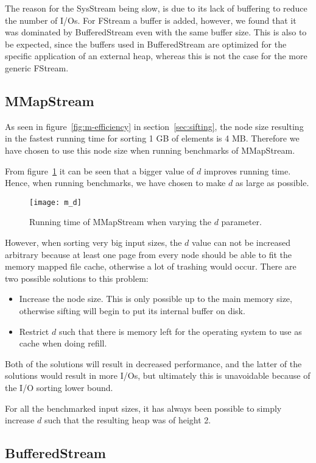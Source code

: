 The reason for the SysStream being slow, is due to its lack of buffering to reduce the number of I/Os. For FStream a buffer is added, however, we found that it was dominated by BufferedStream even with the same buffer size. This is also to be expected, since the buffers used in BufferedStream are optimized for the specific application of an external heap, whereas this is not the case for the more generic FStream.

\subsection{MMapStream}
As seen in figure~\ref{fig:m-efficiency} in section~\ref{sec:sifting}, the node size resulting in the fastest running time for sorting 1 GB of elements is 4 MB. Therefore we have chosen to use this node size when running benchmarks of MMapStream.

From figure~\ref{fig:m:vary-d} it can be seen that a bigger value of $d$ improves running time. Hence, when running benchmarks, we have chosen to make $d$ as large as possible. 

\begin{figure}[h!]
  \centering
  \texttt{[image: m\_d]}
  \caption{Running time of MMapStream when varying the $d$ parameter.}
  \label{fig:m:vary-d}
\end{figure}

However, when sorting very big input sizes, the $d$ value can not be increased arbitrary because at least one page from every node should be able to fit the memory mapped file cache, otherwise a lot of trashing would occur. There are two possible solutions to this problem:
\begin{itemize}
\item Increase the node size. This is only possible up to the main memory size, otherwise sifting will begin to put its internal buffer on disk.
\item Restrict $d$ such that there is memory left for the operating system to use as cache when doing refill.
\end{itemize}
Both of the solutions will result in decreased performance, and the latter of the solutions would result in more I/Os, but ultimately this is unavoidable because of the I/O sorting lower bound.

For all the benchmarked input sizes, it has always been possible to simply increase $d$ such that the resulting heap was of height 2.

\subsection{BufferedStream}
\label{sec:bufferedstream}


